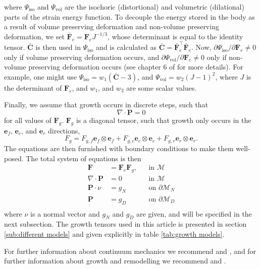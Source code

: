 where $\Psi_\text{iso}$ and $\Psi_\text{vol}$ are the isochoric (distortional) and volumetric (dilational) parts of the strain energy function. To decouple the energy stored in the body as a result of volume preserving deformation and non-volume preserving deformation, we set $\mathbf{\bar{F}}_e = \mathbf{F}_eJ^{-1/3}$, whose determinant is equal to the identity tensor. $\mathbf{\bar{C}}$ is then used in $\Psi_\text{iso}$ and is calculated as $\mathbf{\bar{C}} = \mathbf{\bar{F}}_e^\top \mathbf{\bar{F}}_e$. Now, $\partial\Psi_\text{iso}/\partial \mathbf{F}_e \neq 0$ only if volume preserving deformation occurs, and $\partial\Psi_\text{vol}/\partial \mathbf{F}_e \neq 0$ only if non-volume preserving deformation occurs (see chapter 6 of \cite{Holzapfel2002} for more details). For example, one might use $\Psi_\text{iso} = w_1\left(\mathbf{\bar{C}} - 3\right)$, and $\Psi_\text{vol} = w_2(J-1)^2$, where $J$ is the determinant of $\mathbf{F}_e$, and $w_1$, and $w_2$ are some scalar values. \par 
Finally, we assume that growth occurs in discrete steps, such that 
\begin{equation*}
    \nabla\cdot\mathbf{P} = 0
\end{equation*}
for all values of $\mathbf{F}_g$. $\mathbf{F}_g$ is a diagonal tensor, such that growth only occurs in the $\mathbf{e}_f$, $\mathbf{e}_c$, and $\mathbf{e}_r$ directions, 
\begin{equation*}
    F_g = F_{g,f}\mathbf{e}_f\otimes \mathbf{e}_f + F_{g,c}\mathbf{e}_c\otimes \mathbf{e}_c + F_{g,r}\mathbf{e}_r\otimes \mathbf{e}_r.
\end{equation*}
The equations are then furnished with boundary conditions to make them well-posed. The total system of equations is then
\begin{align}
    \mathbf{F} &= \mathbf{F}_e\mathbf{F}_g, && \text{in } \mathcal{M}\\
    \nabla\cdot\mathbf{P} &= 0 && \text{in } \mathcal{M} \\
    \mathbf{P}\cdot \nu &= g_N && \text{on } \partial\mathcal{M}_N \\
    \mathbf{P} &= g_D && \text{on } \partial\mathcal{M}_D \\
\end{align} 
where $\nu$ is a normal vector and $g_N$ and $g_D$ are given, and will be specified in the next subsection. The growth tensors used in this article is presented in section \ref{sub:different models} and given explicitly in table \ref{tab:growth models}.\par
{}For further information about continuum mechanics we recommend \citep{Marsden1983} and \citep{Holzapfel2002}, and for further information about growth and remodelling we recommend \citep{Goriely2017} and \citep{Yavari2010}.

